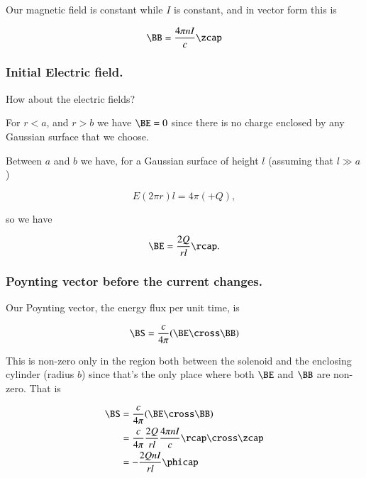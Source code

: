 Our magnetic field is constant while $I$ is constant, and in vector form this is

\begin{equation}\label{eqn:relativisticElectrodynamicsT5:110}
\BB = \frac{4 \pi n I}{c} \zcap
\end{equation}

\subsubsection{Initial Electric field.}

How about the electric fields?

For $r < a$, and $r > b$ we have $\BE = 0$ since there is no charge enclosed by any Gaussian surface that we choose.

Between $a$ and $b$ we have, for a Gaussian surface of height $l$ (assuming that $l \gg a$)

\begin{equation}\label{eqn:relativisticElectrodynamicsT5:130}
E (2 \pi r) l = 4 \pi (+Q),
\end{equation}

so we have

\begin{equation}\label{eqn:relativisticElectrodynamicsT5:150}
\BE = \frac{2 Q }{r l} \rcap.
\end{equation}

\subsubsection{Poynting vector before the current changes.}

Our Poynting vector, the energy flux per unit time, is

\begin{equation}\label{eqn:relativisticElectrodynamicsT5:151}
\BS = \frac{c}{4 \pi} (\BE \cross \BB)
\end{equation}

This is non-zero only in the region both between the solenoid and the enclosing cylinder (radius $b$) since that's the only place where both $\BE$ and $\BB$ are non-zero.  That is

\begin{align*}
\BS &= \frac{c}{4 \pi} (\BE \cross \BB) \\
&=
\frac{c}{4 \pi} \frac{2 Q }{r l} \frac{4 \pi n I}{c} \rcap \cross \zcap \\
&= -\frac{2 Q n I}{r l} \phicap
\end{align*}

